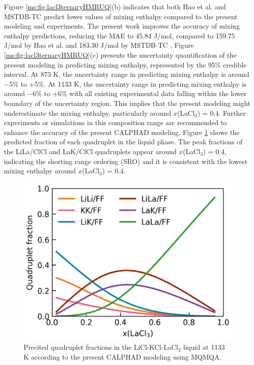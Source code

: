 Figure \ref{ms:fig:lacl3ternaryHMRUQ}(b) indicates that both Hao et al. \cite{hao2024thermodynamic} and MSTDB-TC \cite{ard2022development} predict lower values of mixing enthalpy compared to the present modeling and experiments. The present work improves the accuracy of mixing enthalpy predictions, reducing the MAE to 45.84 J/mol, compared to 159.75 J/mol by Hao et al. \cite{hao2024thermodynamic} and 183.30 J/mol by MSTDB-TC \cite{ard2022development}. Figure \ref{ms:fig:lacl3ternaryHMRUQ}(c) presents the uncertainty quantification of the present modeling in predicting mixing enthalpy, represented by the 95\% credible interval. At 873 K, the uncertainty range in predicting mixing enthalpy is around $-$5\% to +5\%. At 1133 K, the uncertainty range in predicting mixing enthalpy is around $-$6\% to +6\% with all existing experimental data falling within the lower boundary of the uncertainty region. This implies that the present modeling might underestimate the mixing enthalpy, particularly around $x$(LaCl$_3$) = 0.4. Further experiments or simulations in this composition range are recommended to enhance the accuracy of the present CALPHAD modeling. Figure \ref{ms:fig:lacl3quacf} shows the predicted fraction of each quadruplet in the liquid phase. The peak fractions of the LiLa/ClCl and LaK/ClCl quadruplets appear around $x$(LaCl$_3$) = 0.4, indicating the shorting range ordering (SRO) and it is consistent with the lowest mixing enthalpy around $x$(LaCl$_3$) = 0.4. 

\begin{figure} [H]
    \centering
    \includegraphics[width=0.6\linewidth]{moltensalts/Moltensalts-LaCl3-QuadFrac-LaCl3-LiCl-KCl.png}
    \caption{Precited quadruplet fractions in the LiCl-KCl-LaCl$_3$ liquid at 1133 K according to the present CALPHAD modeling using MQMQA.}
    \label{ms:fig:lacl3quacf}
\end{figure}

